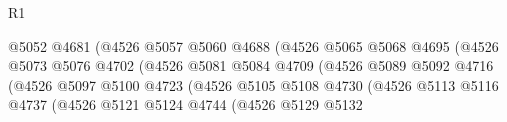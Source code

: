 \begin{lexlean}{R1}
\begin{coremodule}
                                                @5052
                                                @4681
                                                (@4526
                                                  @5057
                                                  @5060
                                                  @4688
                                                  (@4526
                                                    @5065
                                                    @5068
                                                    @4695
                                                    (@4526
                                                      @5073
                                                      @5076
                                                      @4702
                                                      (@4526
                                                        @5081
                                                        @5084
                                                        @4709
                                                        (@4526
                                                          @5089
                                                          @5092
                                                          @4716
                                                          (@4526
                                                            @5097
                                                            @5100
                                                            @4723
                                                            (@4526
                                                              @5105
                                                              @5108
                                                              @4730
                                                              (@4526
                                                                @5113
                                                                @5116
                                                                @4737
                                                                (@4526
                                                                  @5121
                                                                  @5124
                                                                  @4744
                                                                  (@4526
                                                                    @5129
                                                                    @5132

\end{coremodule}
\end{lexlean}
